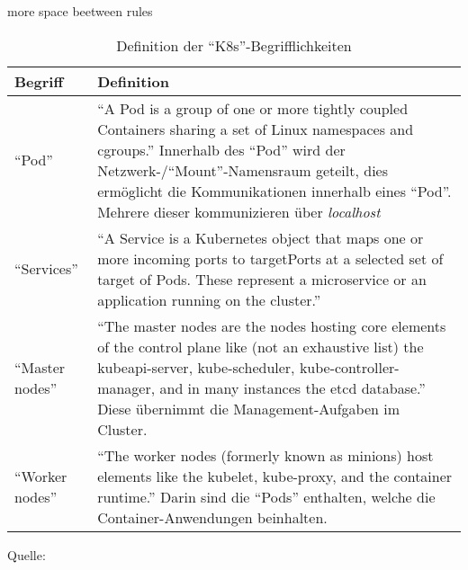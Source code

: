 \begin{table*}[H]
	\centering
	 more space beetween rules
	
	\begin{tabular}{@{}lp{12.0cm}@{}}\toprule[1.5pt]
		
		\textbf{Begriff} & \textbf{Definition}  \\ \midrule
		
		\enquote{Pod} & \enquote{A Pod is a group of one or more tightly coupled Containers sharing a set of Linux namespaces and cgroups.} Innerhalb des \enquote{Pod} wird der Netzwerk-/\enquote{Mount}-Namensraum geteilt, dies ermöglicht die Kommunikationen innerhalb eines \enquote{Pod}. Mehrere dieser kommunizieren über \textit{localhost} \\
		
		\enquote{Services} &  \enquote{A Service is a Kubernetes object that maps one or more incoming ports to targetPorts at a selected set of target of Pods. These represent a microservice or an application running on the cluster.} \\
		
		\enquote{Master nodes} & \enquote{The master nodes are the nodes hosting core elements of the control plane like (not an exhaustive list) the kubeapi-server, kube-scheduler, kube-controller-manager, and in many	instances the etcd database.} Diese übernimmt die Management-Aufgaben im Cluster. \\
		
		\enquote{Worker nodes} & \enquote{The worker nodes (formerly known as minions) host elements like the kubelet, kube-proxy, and the container runtime.} Darin sind die \enquote{Pods} enthalten, welche die Container-Anwendungen beinhalten. \\
		
		\bottomrule[1.5pt]
	\end{tabular}
	
	\caption{Definition der \enquote{\ac{K8s}}-Begrifflichkeiten}
	{\footnotesize{Quelle: \cite[][S.\,10-14]{caban_architecting_2019}}}
	\label{tab:definitionenK8s}
	
\end{table*}

